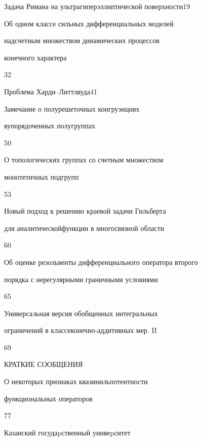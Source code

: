 {Задача Римана на ультрагиперэллиптической поверхности}{19}




{Об одном классе сильных дифференциальных моделей  


над\newline счетным множеством динамических процессов  


конечного характера}{32}




{Проблема Харди--Литтлвуда}{41}




{Замечание о полурешеточных конгруэнциях


в\newline упорядоченных полугруппах}{50}




{О топологических группах со счетным множеством 


монотетичных подгрупп}{53}




{Новый подход к решению краевой задачи Гильберта  


для аналитической\newline функции в многосвязной области}{60}




{Об оценке резольвенты дифференциального оператора второго\newline


порядка с нерегулярными граничными условиями}{65}




{Универсальная версия обобщенных интегральных


ограничений в классе\newline конечно-аддитивных мер. II}{69}


\bigskip





\centerline{КРАТКИЕ СООБЩЕНИЯ}


\bigskip







{О некоторых признаках квазинильпотентности\newline


функциональных операторов}{77}








\vfill


\noindent\raisebox{2pt}{\copyright} Казанский госудаpственный унивеpситет





